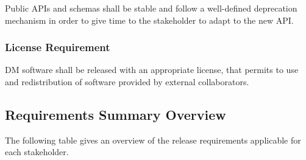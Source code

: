Public APIs and schemas shall be stable and follow a well-defined deprecation mechanism in order to give time to the stakeholder to adapt to the new API.


\subsubsection{License Requirement} \label{sec:license}

DM software shall be released with an appropriate license, that permits to use and redistribution of software provided by external collaborators.


\subsection{Requirements Summary Overview} \label{sec:overview}

The following table gives an overview of the release requirements applicable for each stakeholder.

